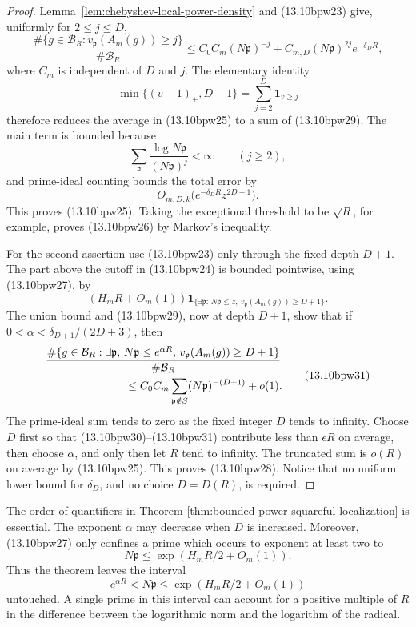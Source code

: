 \documentclass[11pt,reqno]{amsart}
\theoremstyle{definition}
\theoremstyle{remark}
\begin{document}
\begin{proof}
Lemma~\ref{lem:chebyshev-local-power-density} and (13.10bpw23) give,
uniformly for \(2\le j\le D\),
\[
 \frac{\#\{g\in\mathcal B_R:
          v_{\mathfrak p}(A_m(g))\ge j\}}
      {\#\mathcal B_R}
 \le C_0C_m(N\mathfrak p)^{-j}
       +C_{m,D}(N\mathfrak p)^{2j}e^{-\delta_D R},
\tag{13.10bpw29}
\]
where \(C_m\) is independent of \(D\) and \(j\).
The elementary identity
\[
 \min\{(v-1)_+,D-1\}=\sum_{j=2}^D\boldsymbol 1_{v\ge j}
\]
therefore reduces the average in (13.10bpw25) to a sum of (13.10bpw29).
The main term is bounded because
\[
 \sum_{\mathfrak p}\frac{\log N\mathfrak p}
                          {(N\mathfrak p)^j}<\infty
 \qquad(j\ge2),
\]
and prime-ideal counting bounds the total error by
\[
 O_{m,D,k}\bigl(e^{-\delta_D R}z^{2D+1}\bigr).
\]
This proves (13.10bpw25).  Taking the exceptional threshold to be
\(\sqrt R\), for example, proves (13.10bpw26) by Markov's inequality.

For the second assertion use (13.10bpw23) only through the fixed depth
\(D+1\).  The part above the cutoff in (13.10bpw24) is bounded pointwise,
using (13.10bpw27), by
\[
 (H_mR+O_m(1))
 \boldsymbol 1_{\{\exists\mathfrak p:\,
        N\mathfrak p\le z,\ v_{\mathfrak p}(A_m(g))\ge D+1\}}.
\tag{13.10bpw30}
\]
The union bound and (13.10bpw29), now at depth \(D+1\), show that if
\(0<\alpha<\delta_{D+1}/(2D+3)\), then
\[
 \begin{split}
 &\frac{\#\{g\in\mathcal B_R:\exists\mathfrak p,\,
       N\mathfrak p\le e^{\alpha R},\,
       v_{\mathfrak p}(A_m(g))\ge D+1\}}
       {\#\mathcal B_R}\\
 &\hspace{25mm}\le C_0C_m
 \sum_{\mathfrak p\notin S}(N\mathfrak p)^{-(D+1)}+o(1).
\end{split}
\tag{13.10bpw31}
\]
The prime-ideal sum tends to zero as the fixed integer \(D\) tends to
infinity.  Choose \(D\) first so that (13.10bpw30)--(13.10bpw31) contribute
less than \(\epsilon R\) on average, then choose \(\alpha\), and only then
let \(R\) tend to infinity.  The truncated sum is \(o(R)\) on average by
(13.10bpw25).  This proves (13.10bpw28).  Notice that no uniform lower
bound for \(\delta_D\), and no choice \(D=D(R)\), is required.
\end{proof}

The order of quantifiers in Theorem
\ref{thm:bounded-power-squareful-localization} is essential.  The exponent
\(\alpha\) may decrease when \(D\) is increased.  Moreover, (13.10bpw27)
only confines a prime which occurs to exponent at least two to
\[
 N\mathfrak p\le \exp(H_mR/2+O_m(1)).
\]
Thus the theorem leaves the interval
\[
 e^{\alpha R}<N\mathfrak p
 \le \exp(H_mR/2+O_m(1))
\tag{13.10bpw32}
\]
untouched.  A single prime in this interval can account for a positive
multiple of \(R\) in the difference between the logarithmic norm and the
logarithm of the radical.
\end{document}
